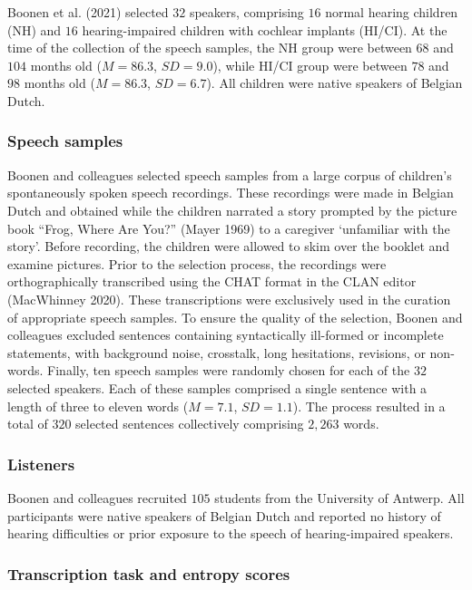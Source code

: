 \documentclass[
sn-apacite
]{sn-jnl}
\begin{document}
Boonen et al. (2021) selected \(32\) speakers, comprising \(16\) normal
hearing children (NH) and \(16\) hearing-impaired children with cochlear
implants (HI/CI). At the time of the collection of the speech samples,
the NH group were between \(68\) and \(104\) months old (\(M=86.3\),
\(SD=9.0\)), while HI/CI group were between \(78\) and \(98\) months old
(\(M=86.3\), \(SD=6.7\)). {All children were native speakers of Belgian
Dutch.}

\subsubsection{Speech samples}\label{sec-M-SS}

Boonen and colleagues selected speech samples from a large corpus of
children's spontaneously spoken speech recordings. These recordings were
{made in Belgian Dutch and obtained while} the children narrated a story
prompted by the picture book ``Frog, Where Are You?'' (Mayer 1969) to a
caregiver `unfamiliar with the story'. Before recording, the children
were allowed to skim over the booklet and examine pictures. Prior to the
selection process, the recordings were orthographically transcribed
using the CHAT format in the CLAN editor (MacWhinney 2020). These
transcriptions were exclusively used in the curation of appropriate
speech samples. To ensure the quality of the selection, Boonen and
colleagues excluded sentences containing syntactically ill-formed or
incomplete statements, with background noise, crosstalk, long
hesitations, revisions, or non-words. Finally, ten speech samples were
randomly chosen for each of the \(32\) selected speakers. Each of these
samples comprised a single sentence with a length of three to eleven
words (\(M=7.1\), \(SD=1.1\)). The process resulted in a total of
\(320\) selected sentences collectively comprising \(2,263\) words.

\subsubsection{Listeners}\label{sec-M-L}

Boonen and colleagues recruited \(105\) students from the University of
Antwerp. All participants were native speakers of Belgian Dutch and
reported no history of hearing difficulties or prior exposure to the
speech of hearing-impaired speakers.

\subsubsection{Transcription task and entropy scores}\label{sec-M-TS}
\end{document}
